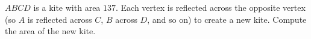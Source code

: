 $ABCD$ is a kite with area $137$. Each vertex is reflected across the opposite vertex (so $A$ is reflected across $C$, $B$ across $D$, and so on) to create a new kite. Compute the area of the new kite.
